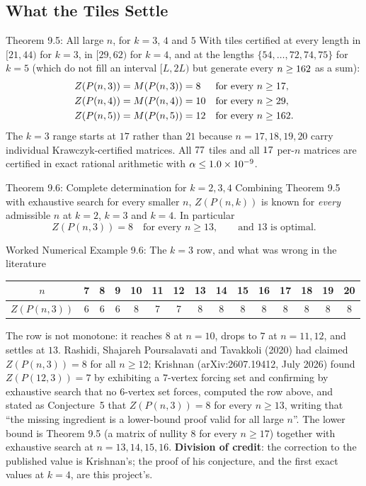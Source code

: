 \documentclass[11pt]{article}
\begin{document}
\subsection{What the Tiles Settle}

\begin{thmbox}{Theorem 9.5: All large $n$, for $k=3$, $4$ and $5$}
With tiles certified at every length in $[21,44)$ for $k=3$, in $[29,62)$ for $k=4$, and at the lengths $\{54,\dots,72,74,75\}$ for $k=5$ (which do not fill an interval $[L,2L)$ but generate every $n\ge162$ as a sum):
\begin{align}
  Z(P(n,3))&=M(P(n,3))=8 &&\text{for every } n\ge17,\\
  Z(P(n,4))&=M(P(n,4))=10 &&\text{for every } n\ge29,\\
  Z(P(n,5))&=M(P(n,5))=12 &&\text{for every } n\ge162.
\end{align}
The $k=3$ range starts at $17$ rather than $21$ because $n=17,18,19,20$ carry individual Krawczyk-certified matrices. All $77$ tiles and all $17$ per-$n$ matrices are certified in exact rational arithmetic with $\alpha\le1.0\times10^{-9}$.
\end{thmbox}

\begin{thmbox}{Theorem 9.6: Complete determination for $k=2,3,4$}
Combining Theorem 9.5 with exhaustive search for every smaller $n$, $Z(P(n,k))$ is known for \emph{every} admissible $n$ at $k=2$, $k=3$ and $k=4$. In particular
\begin{equation}
  Z(P(n,3))=8\quad\text{for every }n\ge13,\qquad\text{and }13\text{ is optimal.}
\end{equation}
\end{thmbox}

\begin{callbox}{Worked Numerical Example 9.6: The $k=3$ row, and what was wrong in the literature}
\begin{center}
\begin{tabular}{c|cccccccccccccc}
$n$ & 7 & 8 & 9 & 10 & 11 & 12 & 13 & 14 & 15 & 16 & 17 & 18 & 19 & 20 \\
\hline
$Z(P(n,3))$ & 6 & 6 & 6 & 8 & 7 & 7 & 8 & 8 & 8 & 8 & 8 & 8 & 8 & 8
\end{tabular}
\end{center}
The row is not monotone: it reaches $8$ at $n=10$, drops to $7$ at $n=11,12$, and settles at $13$. Rashidi, Shajareh Poursalavati and Tavakkoli (2020) had claimed $Z(P(n,3))=8$ for all $n\ge12$; Krishnan (arXiv:2607.19412, July 2026) found $Z(P(12,3))=7$ by exhibiting a $7$-vertex forcing set and confirming by exhaustive search that no $6$-vertex set forces, computed the row above, and stated as Conjecture~5 that $Z(P(n,3))=8$ for every $n\ge13$, writing that ``the missing ingredient is a lower-bound proof valid for all large $n$''. The lower bound is Theorem 9.5 (a matrix of nullity $8$ for every $n\ge17$) together with exhaustive search at $n=13,14,15,16$. \textbf{Division of credit}: the correction to the published value is Krishnan's; the proof of his conjecture, and the first exact values at $k=4$, are this project's.
\end{callbox}
\end{document}
